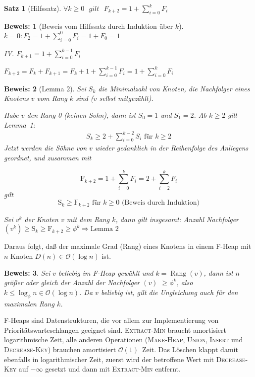 \documentclass[ngerman,draft,parskip=half*,twoside]{scrreprt}
\theoremstyle{break}
\newtheorem{satz}{Satz}[chapter]
\theoremstyle{nonumberbreak}
\newtheorem{beweis}{Beweis:}
\newcommand*{\OO}{\mathcal{O}}      %
\DeclareMathOperator{\rg}{Rang}     %
\begin{document}
\begin{satz}[Hilfssatz]
$\forall k \geq 0 \mbox{ }gilt \mbox{ } F_{k+2}=1+\sum_{i=0}^k F_i$
\end{satz}

\begin{beweis}[Beweis vom Hilfssatz durch Induktion über $k$]
$k=0 : F_2=1+\sum_{i=0}^0 F_i = 1+ F_0 =1$

 IV. $F_{k+1}=1+\sum_{i=0}^{k-1} F_i$

 $F_{k+2}=F_{k}+F_{k+1}=F_k + 1 + \sum_{i=0}^{k-1} F_i = 1+\sum_{i=0}^k F_i$
\end{beweis}

\begin{beweis}[Lemma 2]
Sei $S_k$ die Minimalzahl von Knoten, die Nachfolger eines Knotens $v$ vom Rang $k$ sind ($v$ selbst mitgezählt).

Habe $v$ den Rang 0 (keinen Sohn), dann ist $S_0=1$ und $S_1=2$. Ab
$k\geq2$ gilt Lemma~1:
\begin{gather*}
  S_k \geq 2 + \sum_{i=0}^{k-2} S_i \text{ für }k \geq 2
\end{gather*}
Jetzt werden die Söhne von $v$ wieder gedanklich in der Reihenfolge des Anliegens geordnet, und zusammen mit

\[\mbox{F}_{k+2}=1+\sum_{i=0}^k F_i=2+\sum_{i=2}^k F_i\] gilt \[\mbox{S}_k \geq \mbox{F}_{k+2} \mbox{ für } k \geq 0
\mbox{ (Beweis durch Induktion)}\]

Sei $v^k$ der Knoten $v$ mit dem Rang $k$, dann gilt insgesamt: Anzahl Nachfolger$(v^k) \geq \mbox{S}_k \geq
\mbox{F}_{k+2} \geq {\phi}^k \Rightarrow \mbox{Lemma 2}$ 
\end{beweis}
Daraus folgt, daß der maximale Grad (Rang) eines Knotens in einem F-Heap mit $n$ Knoten $D(n)\in\OO(\log n)$ ist.

\begin{beweis}
Sei $v$ beliebig im F-Heap gewählt und $k=\rg(v)$, dann ist $n$ größer
oder gleich der Anzahl der Nachfolger $(v)$ $\geq {\phi}^k$, also
$k \leq \log_{\phi} n \in \OO(\log n)$. Da $v$ beliebig ist, gilt die Ungleichung auch für den maximalen Rang
$k$. 
\end{beweis}
F-Heaps sind Datenstrukturen, die vor allem zur Implementierung von Prioritätswarteschlangen geeignet sind.
\textsc{Extract-Min} braucht amortisiert logarithmische Zeit, alle anderen Operationen (\textsc{Make-Heap},
\textsc{Union}, \textsc{Insert} und \textsc{Decrease-Key}) brauchen amortisiert $\OO(1)$~Zeit. Das Löschen klappt damit
ebenfalls in logarithmischer Zeit, zuerst wird der betroffene Wert mit \textsc{Decrease-Key} auf $- \infty$ gesetzt
und dann mit \textsc{Extract-Min} entfernt.
\end{document}
